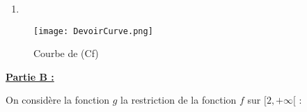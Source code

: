 \documentclass[12pt,a4paper]{article}
\begin{document}
\begin{enumerate}
\begin{enumerate}
\begin{center}
\end{center}
Donc pour que $\sqrt{x^2 - 2x} - (x - 1) <0 $ il faut que $x\in ]2, +\infty[$

Ainsi, si $x\in ]-\infty, 0[$ alors $\sqrt{x^2 - 2x} - (x - 1) > 0 $

Donc \( \forall x \in ]-\infty, 0], f'(x) > 0 \) et \( \forall x \in ]2, +\infty[, f'(x) < 0 \)

\item Dressons le tableau de variations de la fonction \( f \). \hspace{1cm} \textbf{(1,25 pt)}

\begin{center}
\end{center}
\begin{center}
\end{center}
\end{enumerate}
\item 
\end{enumerate}
\begin{center}
\begin{figure}[H]%
\centering
\texttt{[image: DevoirCurve.png]}
\caption{Courbe de (Cf)}
\label{fig:monimage}
\end{figure}
\end{center}
\underline{\textbf{Partie B :}}

On considère la fonction \( g \) la restriction de la fonction \( f \) sur \( [2, +\infty[ \) :
\end{document}
